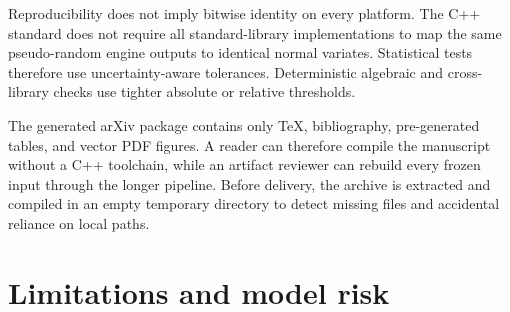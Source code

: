 \documentclass[11pt]{article}
\numberwithin{equation}{section}
\theoremstyle{definition}
\theoremstyle{remark}
\begin{document}
Reproducibility does not imply bitwise identity on every platform. The C++
standard does not require all standard-library implementations to map the same
pseudo-random engine outputs to identical normal variates. Statistical tests
therefore use uncertainty-aware tolerances. Deterministic algebraic and
cross-library checks use tighter absolute or relative thresholds.

The generated arXiv package contains only TeX, bibliography, pre-generated
tables, and vector PDF figures. A reader can therefore compile the manuscript
without a C++ toolchain, while an artifact reviewer can rebuild every frozen
input through the longer pipeline. Before delivery, the archive is extracted
and compiled in an empty temporary directory to detect missing files and
accidental reliance on local paths.

\section{Limitations and model risk}
\label{sec:limitations}
\end{document}
